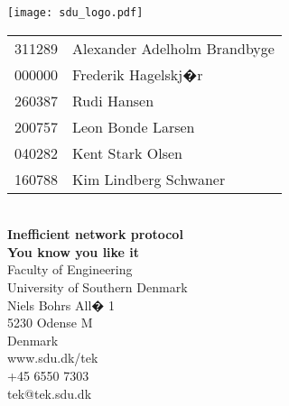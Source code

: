 \begin{titlepage}%
\begin{flushright}
\texttt{[image: sdu\_logo.pdf]}
\end{flushright}
\vspace*{2.7cm}
%
%
\setlength{\extrarowheight}{1.5pt}
\begin{tabular}{@{}l l}
	\textsf{\large{311289}} & \textsf{\large{Alexander Adelholm Brandbyge}}\\
	\textsf{\large{000000}} & \textsf{\large{Frederik Hagelskj�r}}\\
	\textsf{\large{260387}} & \textsf{\large{Rudi Hansen}}\\
	\textsf{\large{200757}} & \textsf{\large{Leon Bonde Larsen}}\\
	\textsf{\large{040282}} & \textsf{\large{Kent Stark Olsen}}\\
	\textsf{\large{160788}} & \textsf{\large{Kim Lindberg Schwaner}}
\end{tabular}
\setlength{\extrarowheight}{0pt}
\vspace*{1.5cm}
\\
\textsf{\Huge{\textbf{\textcolor{FrontpageHeadingColor}{Inefficient network protocol}}}}
\vspace*{0.5cm}
\\
\textsf{\Large{\textbf{\textcolor{FrontpageHeadingColor}{You know you like it}}}}
\vfill
\textsf{\\Faculty of Engineering\\
University of Southern Denmark\\
Niels Bohrs All� 1\\
5230 Odense M\\
Denmark}
\vspace*{10pt}
\\
\textsf{www.sdu.dk/tek\\
+45 6550 7303\\
tek@tek.sdu.dk}
\end{titlepage}%